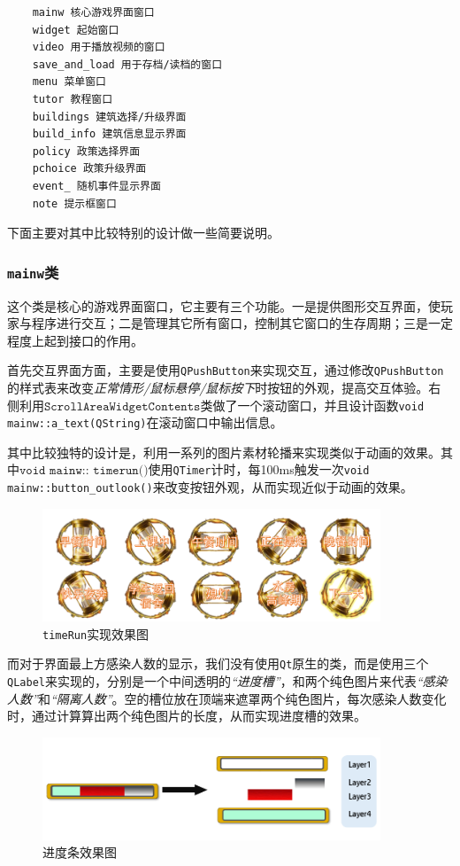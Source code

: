 \documentclass[hyperref,a4paper,UTF8]{ctexart}
\begin{document}
\begin{verbatim}
    mainw 核心游戏界面窗口
    widget 起始窗口
    video 用于播放视频的窗口
    save_and_load 用于存档/读档的窗口
    menu 菜单窗口
    tutor 教程窗口
    buildings 建筑选择/升级界面
    build_info 建筑信息显示界面
    policy 政策选择界面
    pchoice 政策升级界面
    event_ 随机事件显示界面
    note 提示框窗口
\end{verbatim}
下面主要对其中比较特别的设计做一些简要说明。

\subsubsection{\texttt{mainw}类}
这个类是核心的游戏界面窗口，它主要有三个功能。一是提供图形交互界面，使玩家与程序进行交互；二是管理其它所有窗口，控制其它窗口的生存周期；三是一定程度上起到接口的作用。

首先交互界面方面，主要是使用\texttt{QPushButton}来实现交互，通过修改\texttt{QPushButton}的样式表来改变\textit{正常情形/鼠标悬停/鼠标按下}时按钮的外观，提高交互体验。右侧利用$\texttt{ScrollAreaWidgetContents}$类做了一个滚动窗口，并且设计函数\texttt{void mainw::a\_text(QString)}在滚动窗口中输出信息。

其中比较独特的设计是，利用一系列的图片素材轮播来实现类似于动画的效果。其中$\texttt{void mainw:: timerun()}$使用\texttt{QTimer}计时，每100ms触发一次\texttt{void mainw::button\_outlook()}来改变按钮外观，从而实现近似于动画的效果。

\begin{figure}[h]
    \centering
    \includegraphics[width=0.9\textwidth]{timeRun.png}
    \caption{\texttt{timeRun}实现效果图}
\end{figure}

而对于界面最上方感染人数的显示，我们没有使用\texttt{Qt}原生的类，而是使用三个\texttt{QLabel}来实现的，分别是一个中间透明的\textit{“进度槽”}，和两个纯色图片来代表\textit{“感染人数”}和\textit{“隔离人数”}。空的槽位放在顶端来遮罩两个纯色图片，每次感染人数变化时，通过计算算出两个纯色图片的长度，从而实现进度槽的效果。

\begin{figure}[h]
    \centering
    \includegraphics[width=0.9\textwidth]{jinducao.png}
    \caption{进度条效果图}
\end{figure}
\end{document}
